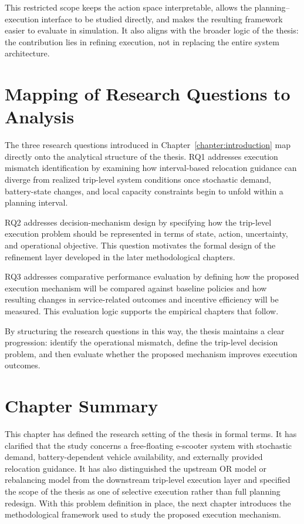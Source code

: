 This restricted scope keeps the action space interpretable, allows the planning--execution interface to be studied directly, and makes the resulting framework easier to evaluate in simulation. It also aligns with the broader logic of the thesis: the contribution lies in refining execution, not in replacing the entire system architecture.

\section{Mapping of Research Questions to Analysis}

The three research questions introduced in Chapter~\ref{chapter:introduction} map directly onto the analytical structure of the thesis. RQ1 addresses execution mismatch identification by examining how interval-based relocation guidance can diverge from realized trip-level system conditions once stochastic demand, battery-state changes, and local capacity constraints begin to unfold within a planning interval.

RQ2 addresses decision-mechanism design by specifying how the trip-level execution problem should be represented in terms of state, action, uncertainty, and operational objective. This question motivates the formal design of the refinement layer developed in the later methodological chapters.

RQ3 addresses comparative performance evaluation by defining how the proposed execution mechanism will be compared against baseline policies and how resulting changes in service-related outcomes and incentive efficiency will be measured. This evaluation logic supports the empirical chapters that follow.

By structuring the research questions in this way, the thesis maintains a clear progression: identify the operational mismatch, define the trip-level decision problem, and then evaluate whether the proposed mechanism improves execution outcomes.

\section{Chapter Summary}

This chapter has defined the research setting of the thesis in formal terms. It has clarified that the study concerns a free-floating e-scooter system with stochastic demand, battery-dependent vehicle availability, and externally provided relocation guidance. It has also distinguished the upstream OR model or rebalancing model from the downstream trip-level execution layer and specified the scope of the thesis as one of selective execution rather than full planning redesign. With this problem definition in place, the next chapter introduces the methodological framework used to study the proposed execution mechanism.
